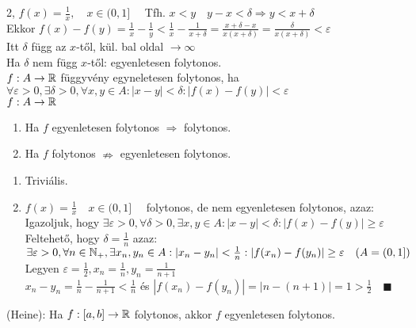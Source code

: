\documentclass[a4paper,11pt]{article}
\begin{document}
2, $f(x) = \frac{1}{x},\quad x\in(0,1]\quad$ Tfh. $x<y\quad y-x<\delta\Rightarrow y<x+\delta$\\[0.1cm] Ekkor $f(x) - f(y) = \frac{1}{x} - \frac{1}{y} < \frac{1}{x} - \frac{1}{x+\delta} = \frac{x+\delta -x}{x(x+\delta)} = \frac{\delta}{x(x+\delta)} < \varepsilon$\\[0.1cm] Itt $\delta$ függ az $x$-től, kül. bal oldal $\to\infty$\\[0.1cm] Ha $\delta$ nem függ $x$-től: egyenletesen folytonos.\\[0.2cm]
 $f: A\to\mathbb{R}$ függyvény egyneletesen folytonos, ha \\[0.1cm] $\forall\varepsilon > 0, \exists\delta > 0, \forall x,y\in A: |x-y|<\delta : |f(x)-f(y)|<\varepsilon$\\[0.2cm]
\tetel $f: A\to\mathbb{R}$
\begin{enumerate}
	\item Ha $f$ egyenletesen folytonos $\Rightarrow$ folytonos.
	\item Ha $f$ folytonos $\nRightarrow$ egyenletesen folytonos.
\end{enumerate}
\biz
\begin{enumerate}
	\item Triviális.
	\item $f(x) = \frac{1}{x}\quad x\in(0,1]\quad$ folytonos, de nem egyenletesen folytonos, azaz:\\[0.1cm] Igazoljuk, hogy $\exists\varepsilon > 0, \forall\delta > 0,\exists x,y\in A: |x-y|<\delta : |f(x)-f(y)| \geq\varepsilon$\\[0.1cm] Feltehető, hogy $\delta = \frac{1}{n}$ azaz:\\[0.1cm] $\exists\varepsilon > 0, \forall n\in\mathbb{N}_+, \exists x_n,y_n\in A: |x_n-y_n|<\frac{1}{n} : |f(x_n)-f(y_n)|\geq\varepsilon\quad (A=(0,1])$\\[0.1cm] Legyen $\varepsilon = \frac{1}{2}, x_n = \frac{1}{n}, y_n = \frac{1}{n+1}$\\[0.1cm] $x_n-y_n = \frac{1}{n} - \frac{1}{n+1} < \frac{1}{n}$ és $|f(x_n)-f(y_n)| = |n-(n+1)| = 1 > \frac{1}{2}\quad\blacksquare$
\end{enumerate}
\tetel (Heine): Ha $f:[a,b]\to\mathbb{R}$ folytonos, akkor $f$ egyenletesen folytonos.\\[0.2cm]
\end{document}
